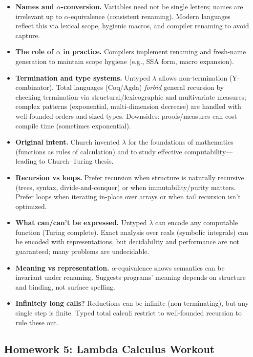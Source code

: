 \documentclass{article}
\theoremstyle{theorem}
\theoremstyle{definition}
\theoremstyle{remark}
\begin{document}
\begin{itemize}
  \item \textbf{Names and $\alpha$-conversion.} Variables need not be single letters; names are irrelevant up to $\alpha$-equivalence (consistent renaming). Modern languages reflect this via lexical scope, hygienic macros, and compiler renaming to avoid capture.
  \item \textbf{The role of $\alpha$ in practice.} Compilers implement renaming and fresh-name generation to maintain scope hygiene (e.g., SSA form, macro expansion).
  \item \textbf{Termination and type systems.} Untyped $\lambda$ allows non-termination (Y-combinator). Total languages (Coq/Agda) \emph{forbid} general recursion by checking termination via structural/lexicographic and multivariate measures; complex patterns (exponential, multi-dimension decrease) are handled with well-founded orders and sized types. Downsides: proofs/measures can cost compile time (sometimes exponential).
  \item \textbf{Original intent.} Church invented $\lambda$ for the foundations of mathematics (functions as rules of calculation) and to study effective computability—leading to Church–Turing thesis.
  \item \textbf{Recursion vs loops.} Prefer recursion when structure is naturally recursive (trees, syntax, divide-and-conquer) or when immutability/purity matters. Prefer loops when iterating in-place over arrays or when tail recursion isn’t optimized.
  \item \textbf{What can/can’t be expressed.} Untyped $\lambda$ can encode any computable function (Turing complete). Exact analysis over reals (symbolic integrals) can be encoded with representations, but decidability and performance are not guaranteed; many problems are undecidable.
  \item \textbf{Meaning vs representation.} $\alpha$-equivalence shows semantics can be invariant under renaming. Suggests programs’ meaning depends on structure and binding, not surface spelling.
  \item \textbf{Infinitely long calls?} Reductions can be infinite (non-terminating), but any single step is finite. Typed total calculi restrict to well-founded recursion to rule these out.
\end{itemize}

\subsection{Homework 5: Lambda Calculus Workout}
\end{document}
